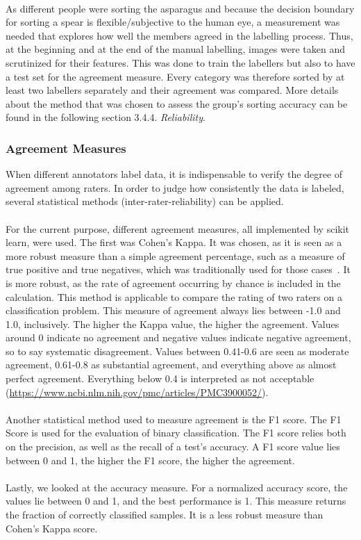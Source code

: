 \\
As different people were sorting the asparagus and because the decision boundary for sorting a spear is flexible/subjective to the human eye, a measurement was needed that explores how well the members agreed in the labelling process. Thus, at the beginning and at the end of the manual labelling, images were taken and scrutinized for their features. This was done to train the labellers but also to have a test set for the agreement measure. Every category was therefore sorted by at least two labellers separately and their agreement was compared. More details about the method that was chosen to assess the group’s sorting accuracy can be found in the following section 3.4.4. \textit{Reliability}.


\subsubsection{Agreement Measures}

When different annotators label data, it is indispensable to verify the degree of agreement among raters. In order to judge how consistently the data is labeled, several statistical methods (inter-rater-reliability) can be applied. \\
 \\
For the current purpose, different agreement measures, all implemented by scikit learn, were used. The first was Cohen’s Kappa. It was chosen, as it is seen as a more robust measure than a simple agreement percentage, such as a measure of true positive and true negatives, which was traditionally used for those cases~\citep{cohen1960coefficient}. It is more robust, as the rate of agreement occurring by chance is included in the calculation. This method is applicable to compare the rating of two raters on a classification problem. This measure of agreement always lies between -1.0 and 1.0, inclusively. The higher the Kappa value, the higher the agreement. Values around 0 indicate no agreement and negative values indicate negative agreement, so to say systematic disagreement. Values between 0.41-0.6 are seen as moderate agreement, 0.61-0.8 as substantial agreement, and everything above as almost perfect agreement. Everything below 0.4 is interpreted as not acceptable (\url{https://www.ncbi.nlm.nih.gov/pmc/articles/PMC3900052/}). \\
\\
Another statistical method used to measure agreement is the F1 score. The F1 Score is used for the evaluation of binary classification. The F1 score relies both on the precision, as well as the recall of a test’s accuracy. A F1 score value lies between 0 and 1, the higher the F1 score, the higher the agreement. \\
\\
Lastly, we looked at the accuracy measure. For a normalized accuracy score, the values lie between 0 and 1, and the best performance is 1. This measure returns the fraction of correctly classified samples. It is a less robust measure than Cohen’s Kappa score.

